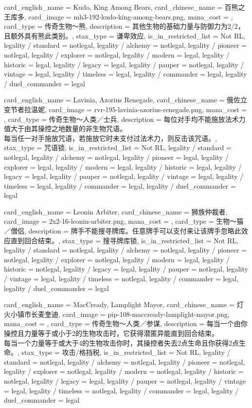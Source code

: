 \documentclass[lang = cn, color = black, 10pt]{AllThatStax}
\begin{document}
\card
{
	card_english_name = {Kudo, King Among Bears},
	card_chinese_name = {百熊之王库多},
	card_image = mh3-192-kudo-king-among-bears.png,
	mana_cost = ,
	card_type = 传奇生物～熊,
	description = {其他生物的基础力量与防御力为2/2，且额外具有熊此类别。},
	stax_type = 谦卑效应,
	is_in_restricted_list = Not RL,
	legality / standard = notlegal,
	legality / alchemy = notlegal,
	legality / pioneer = notlegal,
	legality / explorer = notlegal,
	legality / modern = legal,
	legality / historic = legal,
	legality / legacy = legal,
	legality / pauper = notlegal,
	legality / vintage = legal,
	legality / timeless = legal,
	legality / commander = legal,
	legality / duel_commander = legal
}

\card
{
	card_english_name = {Lavinia, Azorius Renegade},
	card_chinese_name = {俄佐立变节者拉温妮},
	card_image = rvr-195-lavinia-azorius-renegade.png,
	mana_cost = ,
	card_type = 传奇生物～人类／士兵,
	description = {每位对手均不能施放法术力值大于由其操控之地数量的非生物咒语。\\
每当任一对手施放咒语，若施放它时未支付过法术力，则反击该咒语。},
	stax_type = 咒语锁,
	is_in_restricted_list = Not RL,
	legality / standard = notlegal,
	legality / alchemy = notlegal,
	legality / pioneer = legal,
	legality / explorer = legal,
	legality / modern = legal,
	legality / historic = legal,
	legality / legacy = legal,
	legality / pauper = notlegal,
	legality / vintage = legal,
	legality / timeless = legal,
	legality / commander = legal,
	legality / duel_commander = legal
}

\card
{
	card_english_name = {Leonin Arbiter},
	card_chinese_name = {狮族仲裁者},
	card_image = 2x2-16-leonin-arbiter.png,
	mana_cost = ,
	card_type = 生物～猫／僧侣,
	description = {牌手不能搜寻牌库。任意牌手可以支付来让该牌手忽略此效应直到回合结束。},
	stax_type = 搜寻牌库锁,
	is_in_restricted_list = Not RL,
	legality / standard = notlegal,
	legality / alchemy = notlegal,
	legality / pioneer = notlegal,
	legality / explorer = notlegal,
	legality / modern = legal,
	legality / historic = notlegal,
	legality / legacy = legal,
	legality / pauper = notlegal,
	legality / vintage = legal,
	legality / timeless = notlegal,
	legality / commander = legal,
	legality / duel_commander = legal
}

\card
{
	card_english_name = {MacCready, Lamplight Mayor},
	card_chinese_name = {灯火小镇市长麦奎迪},
	card_image = pip-108-maccready-lamplight-mayor.png,
	mana_cost = ,
	card_type = 传奇生物～人类／参谋,
	description = {每当一个由你操控且力量等于或小于2的生物攻击时，它获得潜匿异能直到回合结束。\\
每当一个力量等于或大于4的生物攻击你时，其操控者失去2点生命且你获得2点生命。},
	stax_type = 攻击/格挡税,
	is_in_restricted_list = Not RL,
	legality / standard = notlegal,
	legality / alchemy = notlegal,
	legality / pioneer = notlegal,
	legality / explorer = notlegal,
	legality / modern = notlegal,
	legality / historic = notlegal,
	legality / legacy = legal,
	legality / pauper = notlegal,
	legality / vintage = legal,
	legality / timeless = notlegal,
	legality / commander = legal,
	legality / duel_commander = legal
}
\end{document}
